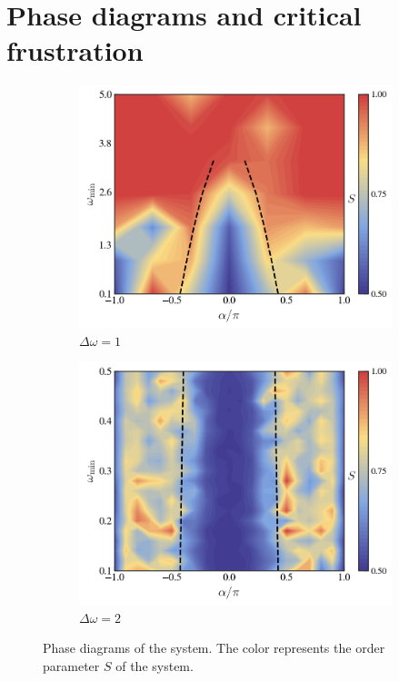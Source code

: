 \documentclass{article}
\begin{document}
\section{Phase diagrams and critical frustration}
\begin{figure}[H]
    \centering
    \begin{subfigure}{0.45\textwidth}
        \centering
        \includegraphics[width=1\textwidth]{figs/phaseDiagram1.png}
        \caption{$\Delta \omega=1$}
        \label{fig:phaseDiagramDeltaOmega1}
    \end{subfigure}
    \begin{subfigure}{0.45\textwidth}
        \centering
        \includegraphics[width=1\textwidth]{figs/phaseDiagram2.png}
        \caption{$\Delta \omega=2$}
        \label{fig:phaseDiagramDeltaOmega2}
    \end{subfigure}
    \caption{Phase diagrams of the system. The color represents the order parameter $S$ of the system.}
    \label{fig:phaseDiagrams}
\end{figure}
\end{document}
